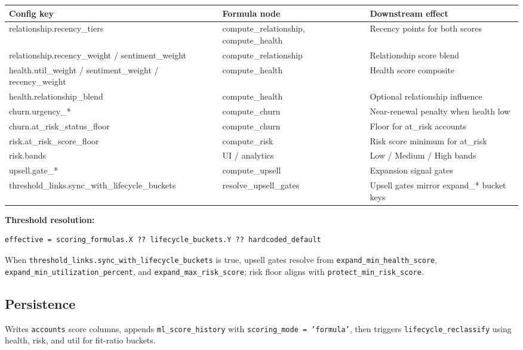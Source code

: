 \documentclass[11pt,a4paper]{article}
\begin{document}
\begin{tabularx}{\textwidth}{@{}L{4.2cm} p{3.2cm} Y@{}}
\toprule
\textbf{Config key} & \textbf{Formula node} & \textbf{Downstream effect} \\
\midrule
relationship.recency\_tiers & compute\_relationship, compute\_health & Recency points for both scores \\
relationship.recency\_weight / sentiment\_weight & compute\_relationship & Relationship score blend \\
health.util\_weight / sentiment\_weight / recency\_weight & compute\_health & Health score composite \\
health.relationship\_blend & compute\_health & Optional relationship influence \\
churn.urgency\_* & compute\_churn & Near-renewal penalty when health low \\
churn.at\_risk\_status\_floor & compute\_churn & Floor for at\_risk accounts \\
risk.at\_risk\_score\_floor & compute\_risk & Risk score minimum for at\_risk \\
risk.bands & UI / analytics & Low / Medium / High bands \\
upsell.gate\_* & compute\_upsell & Expansion signal gates \\
threshold\_links.sync\_with\_lifecycle\_buckets & resolve\_upsell\_gates & Upsell gates mirror expand\_* bucket keys \\
\bottomrule
\end{tabularx}

\textbf{Threshold resolution:}
\begin{lstlisting}
effective = scoring_formulas.X ?? lifecycle_buckets.Y ?? hardcoded_default
\end{lstlisting}

When \texttt{threshold\_links.sync\_with\_lifecycle\_buckets} is true, upsell gates resolve from \texttt{expand\_min\_health\_score}, \texttt{expand\_min\_utilization\_percent}, and \texttt{expand\_max\_risk\_score}; risk floor aligns with \texttt{protect\_min\_risk\_score}.

\subsection{Persistence}

Writes \texttt{accounts} score columns, appends \texttt{ml\_score\_history} with \texttt{scoring\_mode = 'formula'}, then triggers \texttt{lifecycle\_reclassify} using health, risk, and util for fit-ratio buckets.
\end{document}
